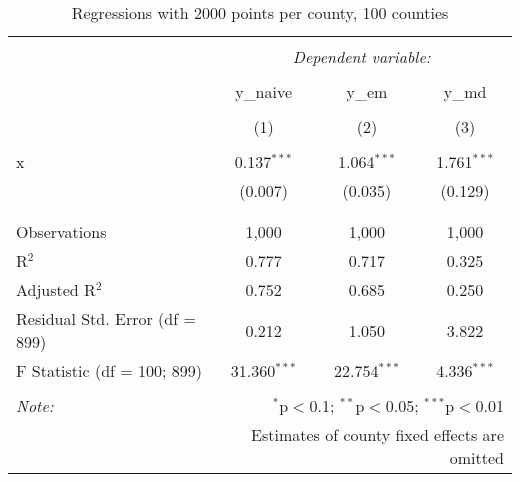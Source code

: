 
\begin{table}[!htbp] \centering 
  \caption{Regressions with 2000 points per county, 100 counties} 
  \label{} 
\begin{tabular}{@{\extracolsep{5pt}}lccc} 
\\[-1.8ex]\hline 
\hline \\[-1.8ex] 
 & \multicolumn{3}{c}{\textit{Dependent variable:}} \\ 
\cline{2-4} 
\\[-1.8ex] & y\_naive & y\_em & y\_md \\ 
\\[-1.8ex] & (1) & (2) & (3)\\ 
\hline \\[-1.8ex] 
 x & 0.137$^{***}$ & 1.064$^{***}$ & 1.761$^{***}$ \\ 
  & (0.007) & (0.035) & (0.129) \\ 
  & & & \\ 
\hline \\[-1.8ex] 
Observations & 1,000 & 1,000 & 1,000 \\ 
R$^{2}$ & 0.777 & 0.717 & 0.325 \\ 
Adjusted R$^{2}$ & 0.752 & 0.685 & 0.250 \\ 
Residual Std. Error (df = 899) & 0.212 & 1.050 & 3.822 \\ 
F Statistic (df = 100; 899) & 31.360$^{***}$ & 22.754$^{***}$ & 4.336$^{***}$ \\ 
\hline 
\hline \\[-1.8ex] 
\textit{Note:}  & \multicolumn{3}{r}{$^{*}$p$<$0.1; $^{**}$p$<$0.05; $^{***}$p$<$0.01} \\ 
 & \multicolumn{3}{r}{Estimates of county fixed effects are omitted} \\ 
\end{tabular} 
\end{table} 
